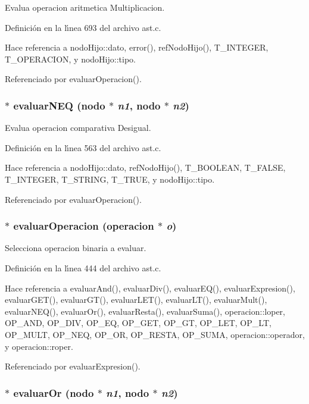 Evalua operacion aritmetica Multiplicacion. 



Definici\'{o}n en la l\'{\i}nea 693 del archivo ast.c.

Hace referencia a nodo\-Hijo::dato, error(), ref\-Nodo\-Hijo(), T\_\-INTEGER, T\_\-OPERACION, y nodo\-Hijo::tipo.

Referenciado por evaluar\-Operacion().
\subsubsection{$\ast$ evaluar\-NEQ ({\bf nodo} $\ast$ {\em n1}, {\bf nodo} $\ast$ {\em n2})}\label{ast_8h_a49}


Evalua operacion comparativa Desigual. 



Definici\'{o}n en la l\'{\i}nea 563 del archivo ast.c.

Hace referencia a nodo\-Hijo::dato, ref\-Nodo\-Hijo(), T\_\-BOOLEAN, T\_\-FALSE, T\_\-INTEGER, T\_\-STRING, T\_\-TRUE, y nodo\-Hijo::tipo.

Referenciado por evaluar\-Operacion().
\subsubsection{$\ast$ evaluar\-Operacion ({\bf operacion} $\ast$ {\em o})}\label{ast_8h_a41}


Selecciona operacion binaria a evaluar. 



Definici\'{o}n en la l\'{\i}nea 444 del archivo ast.c.

Hace referencia a evaluar\-And(), evaluar\-Div(), evaluar\-EQ(), evaluar\-Expresion(), evaluar\-GET(), evaluar\-GT(), evaluar\-LET(), evaluar\-LT(), evaluar\-Mult(), evaluar\-NEQ(), evaluar\-Or(), evaluar\-Resta(), evaluar\-Suma(), operacion::loper, OP\_\-AND, OP\_\-DIV, OP\_\-EQ, OP\_\-GET, OP\_\-GT, OP\_\-LET, OP\_\-LT, OP\_\-MULT, OP\_\-NEQ, OP\_\-OR, OP\_\-RESTA, OP\_\-SUMA, operacion::operador, y operacion::roper.

Referenciado por evaluar\-Expresion().
\subsubsection{$\ast$ evaluar\-Or ({\bf nodo} $\ast$ {\em n1}, {\bf nodo} $\ast$ {\em n2})}\label{ast_8h_a42}


